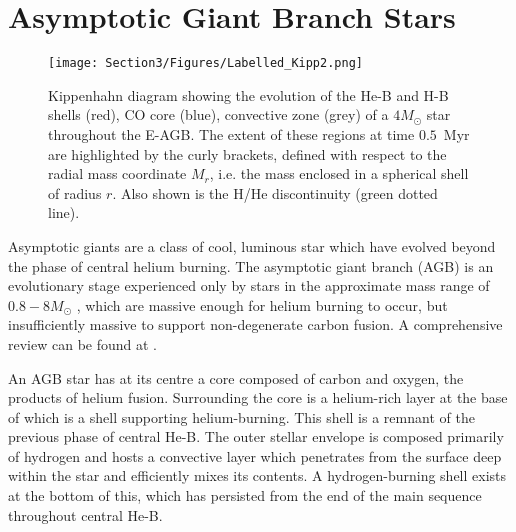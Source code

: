 \section{Asymptotic Giant Branch Stars}
\label{sec: Sec 3}
\begin{figure}[t]
    \centering
    \texttt{[image: Section3/Figures/Labelled\_Kipp2.png]}
    \caption{Kippenhahn diagram showing the evolution of the He-B and H-B shells (red), CO core (blue), convective zone (grey) of a $4M_{\odot}$ star throughout the E-AGB. The extent of these regions at time $0.5$~Myr are highlighted by the curly brackets, defined with respect to the radial mass coordinate $M_r$, i.e. the mass enclosed in a spherical shell of radius $r$. Also shown is the H/He discontinuity (green dotted line).}
    \label{fig: 4M Kippenhahn}
\end{figure}


Asymptotic giants are a class of cool, luminous star which have evolved beyond the phase of central helium burning. The asymptotic giant branch (AGB) is an evolutionary stage experienced only by stars in the approximate mass range of $0.8-8M_{\odot}$ \cite{2012sse..book.....K}, which are massive enough for helium burning to occur, but insufficiently massive to support non-degenerate carbon fusion. A comprehensive review can be found at \cite{AGBStarsBook}.





An AGB star has at its centre a core composed of carbon and oxygen, the products of helium fusion. Surrounding the core is a helium-rich layer at the base of which is a shell supporting helium-burning. This shell is a remnant of the previous phase of central He-B. The outer stellar envelope is composed primarily of hydrogen and hosts a convective layer which penetrates from the surface deep within the star and efficiently mixes its contents. A hydrogen-burning shell exists at the bottom of this, which has persisted from the end of the main sequence throughout central He-B.


